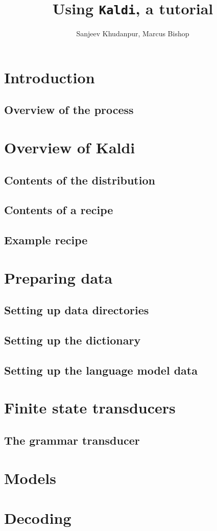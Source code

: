 \documentclass[12pt]{article}
\title{Using \texttt{Kaldi}, a tutorial}
\author{Sanjeev Khudanpur, Marcus Bishop}
\begin{document}
\maketitle

\section{Introduction}

\subsection{Overview of the process}


\section{Overview of \textsf{Kaldi}}

\subsection{Contents of the distribution}

\subsection{Contents of a recipe}

\subsection{Example recipe}


\section{Preparing data}\label{data}

\subsection{Setting up data directories}

\subsection{Setting up the dictionary}\label{dict}

\subsection{Setting up the language model data}


\section{Finite state transducers}\label{fst}

\subsection{The grammar transducer}

\section{Models}\label{model}
\section{Decoding}\label{decode}



\end{document}
